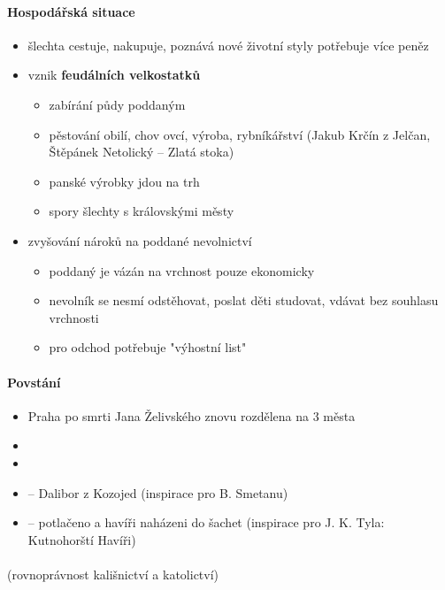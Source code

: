 \paragraph{Hospodářská situace}
\begin{itemize}
\item šlechta cestuje, nakupuje, poznává nové životní styly \ra potřebuje více peněz
\item[\ra] vznik \textbf{feudálních velkostatků}
	\begin{itemize}
	\item zabírání půdy poddaným
	\item pěstování obilí, chov ovcí, výroba, rybníkářství (Jakub Krčín z Jelčan, Štěpánek Netolický -- Zlatá stoka)
	\item[\ra] panské výrobky jdou na trh
	\item spory šlechty s královskými městy
	\end{itemize}
\item zvyšování nároků na poddané \ra nevolnictví
	\begin{itemize}
	\item poddaný je vázán na vrchnost pouze ekonomicky
	\item nevolník se nesmí odstěhovat, poslat děti studovat, vdávat bez souhlasu vrchnosti
	\item pro odchod potřebuje "výhostní list"
	\end{itemize}
\end{itemize}

\paragraph{Povstání}
\begin{itemize}
\item Praha po smrti Jana Želivského znovu rozdělena na 3 města
\item {}
\item {}
\item {} -- Dalibor z Kozojed (inspirace pro B. Smetanu)
\item {} -- potlačeno a havíři naházeni do šachet (inspirace pro J. K. Tyla: Kutnohorští Havíři)
\end{itemize}

\paragraph{} (rovnoprávnost kališnictví a katolictví)

